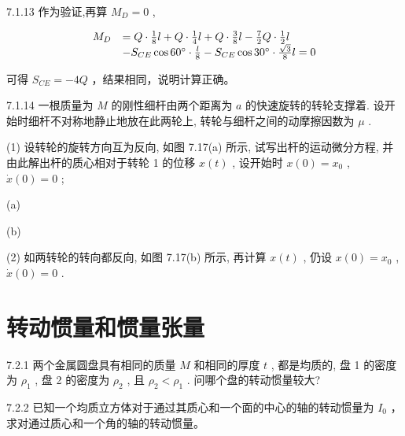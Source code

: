 \begin{problem}{7.1.13}
作为验证,再算 $M_{D}=0$ ,

\[
\begin{array}{r l} M _ {D} & = Q \cdot \frac {1}{8} l + Q \cdot \frac {1}{4} l + Q \cdot \frac {3}{8} l - \frac {7}{2} Q \cdot \frac {1}{2} l \\ & - S _ {C E} \cos 6 0 ^ {\circ} \cdot \frac {l}{8} - S _ {C E} \cos 3 0 ^ {\circ} \cdot \frac {\sqrt {3}}{8} l = 0 \end{array}
\]

可得 $S_{CE} = -4Q$ ，结果相同，说明计算正确。
\begin{center}

\end{center}
\begin{center}

\end{center}
\end{problem}
\clearpage


\begin{problem}{7.1.14}
一根质量为 $M$ 的刚性细杆由两个距离为 $a$ 的快速旋转的转轮支撑着. 设开始时细杆不对称地静止地放在此两轮上, 转轮与细杆之间的动摩擦因数为 $\mu$ .

(1) 设转轮的旋转方向互为反向, 如图 7.17(a) 所示, 试写出杆的运动微分方程, 并由此解出杆的质心相对于转轮 1 的位移 $x(t)$ , 设开始时 $x(0) = x_0$ , $\dot{x}(0) = 0$ ;

(a)

(b)

(2) 如两转轮的转向都反向, 如图 7.17(b) 所示, 再计算 $x(t)$ , 仍设 $x(0) = x_0$ , $\dot{x}(0) = 0$ .
\begin{center}

\end{center}
\begin{center}

\end{center}
\end{problem}
\clearpage


\section{转动惯量和惯量张量}

\begin{problem}{7.2.1}
两个金属圆盘具有相同的质量 $M$ 和相同的厚度 $t$ , 都是均质的, 盘 1 的密度为 $\rho_{1}$ , 盘 2 的密度为 $\rho_{2}$ , 且 $\rho_{2} < \rho_{1}$ . 问哪个盘的转动惯量较大?
\end{problem}
\clearpage


\begin{problem}{7.2.2}
已知一个均质立方体对于通过其质心和一个面的中心的轴的转动惯量为 $I_{0}$ ，求对通过质心和一个角的轴的转动惯量。
\end{problem}
\clearpage


